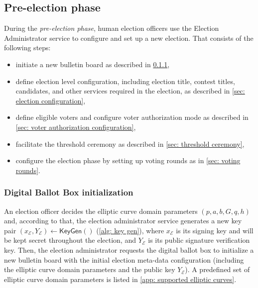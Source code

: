 \subsection{Pre-election phase} \label{sec: pre-election phase}
During the \textit{pre-election phase}, human election officers use the Election Administrator service to configure and set up a new election. That consists of the following steps:
\begin{itemize}
    \item initiate a new bulletin board as described in \cref{sec: digital ballot box initialization},
    \item define election level configuration, including election title, contest titles, candidates, and other services required in the election, as described in \cref{sec: election configuration},
    \item define eligible voters and configure voter authorization mode as described in \cref{sec: voter authorization configuration},
    \item facilitate the threshold ceremony as described in \cref{sec: threshold ceremony},
    \item configure the election phase by setting up voting rounds as in \cref{sec: voting rounds}.
\end{itemize}


\subsubsection{Digital Ballot Box initialization} \label{sec: digital ballot box initialization}
An election officer decides the elliptic curve domain parameters $(p, a, b, G, q, h)$ and, according to that, the election administrator service generates a new key pair $(x_\mathcal{E}, Y_\mathcal{E}) \gets \mathsf{KeyGen}()$ (\cref{alg: key gen}), where $x_\mathcal{E}$ is its signing key and will be kept secret throughout the election, and $Y_\mathcal{E}$ is its public signature verification key. Then, the election administrator requests the digital ballot box to initialize a new bulletin board with the initial election meta-data configuration (including the elliptic curve domain parameters and the public key $Y_\mathcal{E}$). A predefined set of elliptic curve domain parameters is listed in \cref{app: supported elliptic curves}.

